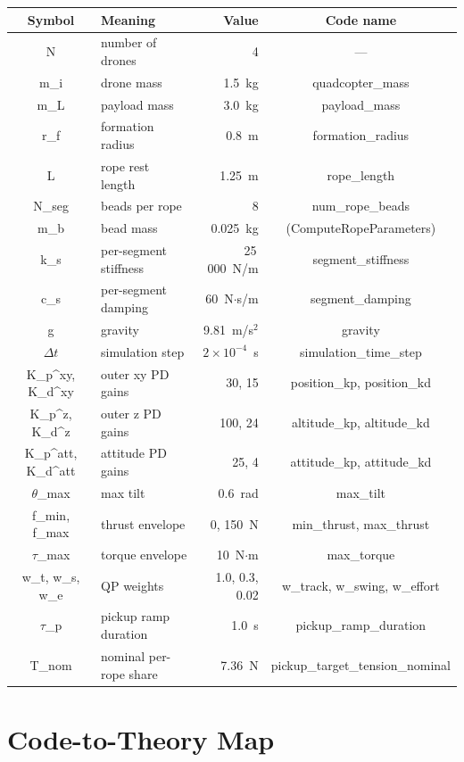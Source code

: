 \documentclass[11pt,a4paper,oneside]{report}
\begin{document}
\begin{longtable}{>{\ttfamily}c p{} r >{\ttfamily}c}
\toprule
\textbf{Symbol} & \textbf{Meaning} & \textbf{Value} &
\textbf{Code name} \\
\midrule
N & number of drones & 4 & --- \\
m\_i & drone mass & 1.5~kg & quadcopter\_mass \\
m\_L & payload mass & 3.0~kg & payload\_mass \\
r\_f & formation radius & 0.8~m & formation\_radius \\
L & rope rest length & 1.25~m & rope\_length \\
N\_seg & beads per rope & 8 & num\_rope\_beads \\
m\_b & bead mass & 0.025~kg & (ComputeRopeParameters) \\
k\_s & per-segment stiffness & 25\,000~N/m & segment\_stiffness \\
c\_s & per-segment damping & 60~N$\cdot$s/m & segment\_damping \\
g & gravity & 9.81~m/s$^2$ & gravity \\
$\Delta t$ & simulation step & $2\!\times\!10^{-4}$~s & simulation\_time\_step \\
K\_p\textasciicircum xy, K\_d\textasciicircum xy & outer xy PD gains & 30, 15 & position\_kp, position\_kd \\
K\_p\textasciicircum z, K\_d\textasciicircum z & outer z PD gains & 100, 24 & altitude\_kp, altitude\_kd \\
K\_p\textasciicircum att, K\_d\textasciicircum att & attitude PD gains & 25, 4 & attitude\_kp, attitude\_kd \\
$\theta$\_max & max tilt & 0.6~rad & max\_tilt \\
f\_min, f\_max & thrust envelope & 0, 150~N & min\_thrust, max\_thrust \\
$\tau$\_max & torque envelope & 10~N$\cdot$m & max\_torque \\
w\_t, w\_s, w\_e & QP weights & 1.0, 0.3, 0.02 & w\_track, w\_swing, w\_effort \\
$\tau$\_p & pickup ramp duration & 1.0~s & pickup\_ramp\_duration \\
T\_nom & nominal per-rope share & 7.36~N & pickup\_target\_tension\_nominal \\
\bottomrule
\end{longtable}

\chapter{Code-to-Theory Map}
\label{chap:code-map}
\end{document}
